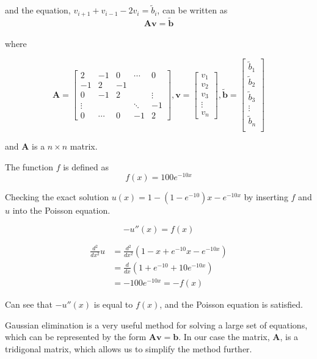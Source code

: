 \documentclass[%
oneside,                 %
final,                   %
10pt]{article}
\begin{document}
and the equation, $v_{i+1}+v_{i-1}-2v_i =\tilde{b}_i$, can be written as
$$\mathbf{Av}=\mathbf{\tilde{b}} $$\\

where

\begin{equation*}
\mathbf{A}=\begin{bmatrix}
2 & -1 & 0 & \cdots & 0\\
-1 & 2 & -1 & & \\
0 & -1 & 2 & & \vdots \\
\vdots & & & \ddots &-1\\
0 & \cdots & 0 & -1 & 2
\end{bmatrix},
\mathbf{v}=
\begin{bmatrix}
v_1\\
v_2\\
v_3\\
\vdots\\
v_n
\end{bmatrix},
\mathbf{\tilde{b}}=\begin{bmatrix}
\tilde{b}_1\\
\tilde{b}_2\\
\tilde{b}_3\\
\vdots\\
\tilde{b}_n\\
\end{bmatrix}
\end{equation*}

and $\mathbf{A}$ is a $n\times n$ matrix.

\vskip0.7cm
The function $f$ is defined as
$$f(x)=100e^{-10x}$$

Checking the exact solution $u(x)=1-(1-e^{-10})x-e^{-10x}$ by inserting $f$ and $u$ into the Poisson equation.

$$-u''(x)=f(x)$$

\begin{equation*}
\begin{split}
\frac{d^2}{dx^2}u&=\frac{d^2}{dx^2}(1-x+e^{-10}x-e^{-10x})\\
&=\frac{d}{dx}(1+e^{-10}+10e^{-10x})\\
&=-100e^{-10x} = -f(x)
\end{split}
\end{equation*}

Can see that $-u''(x)$ is equal to $f(x)$, and the Poisson equation is satisfied.

\vskip1cm




Gaussian elimination is a very useful method for solving a large set of equations, which can be represented by the form $\mathbf{Av}=\mathbf{b}$. In our case the matrix, $\mathbf{A}$, is a tridigonal matrix, which allows us to simplify the method further.
\end{document}
